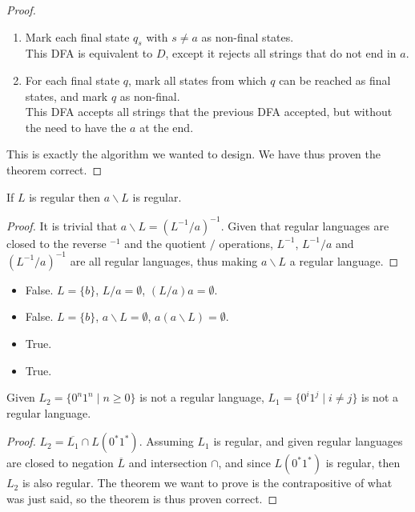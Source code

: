 \documentclass[docid=TP07]{tcom_TP}
\begin{document}
{\begin{proof}
\begin{enumerate}
	This DFA is equivalent to $D$, but each final state has only inward transitions from a sigle symbol $s$.
	\item Mark each final state $q_s$ with $s \neq a$ as non-final states.\\
	This DFA is equivalent to $D$, except it rejects all strings that do not end in $a$.
	\item For each final state $q$, mark all states from which $q$ can be reached as final states, and mark $q$ as non-final.\\
	This DFA accepts all strings that the previous DFA accepted, but without the need to have the $a$ at the end.
\end{enumerate}
This is exactly the algorithm we wanted to design. We have thus proven the theorem correct.
\end{proof}
\begin{theorem}
If $L$ is regular then $a\backslash L$ is regular.
\end{theorem}
\begin{proof}
It is trivial that $a \backslash L=(L^{-1}/a)^{-1}$. Given that regular languages are closed to the reverse $^{-1}$ and the quotient $/$ operations, $L^{-1}$, $L^{-1}/a$ and $(L^{-1}/a)^{-1}$ are all regular languages, thus making $a \backslash L$ a regular language.
\end{proof}
\begin{itemize}
	\item False. $L=\{b\}$, $L/a=\emptyset$, $(L/a)a=\emptyset$.
	\item False. $L=\{b\}$, $a \backslash L = \emptyset$, $a(a \backslash L)=\emptyset$.
	\item True.
	\item True.
\end{itemize}
\begin{theorem}
Given $L_2=\{0^n1^n\mid n \geq 0\}$ is not a regular language, $L_1=\{0^i1^j\mid i \neq j\}$ is not a regular language.
\end{theorem}
\begin{proof}
$L_2=\overline{L_1} \cap L(0^*1^*)$. Assuming $L_1$ is regular, and given regular languages are closed to negation $\overline{L}$ and intersection $\cap$, and since $L(0^*1^*)$ is regular, then $L_2$ is also regular. The theorem we want to prove is the contrapositive of what was just said, so the theorem is thus proven correct.
\end{proof}
}
\end{document}
